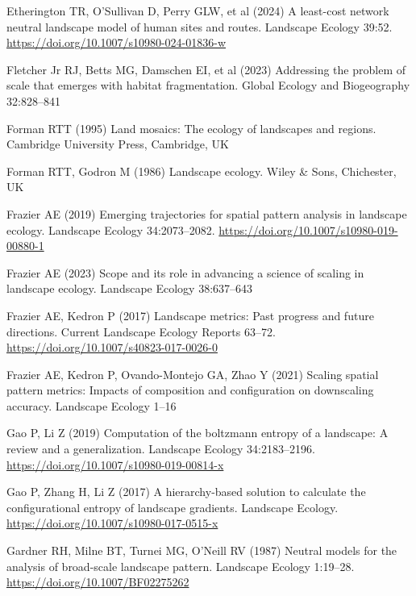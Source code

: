 \documentclass[
  10pt,
  a4paperpaper,
]{article}
\newlength{\cslhangindent}
\newenvironment{CSLReferences}[2] %
 {\begin{list}{}{%
  \setlength{\itemindent}{0pt}
  \setlength{\leftmargin}{0pt}
  \setlength{\parsep}{0pt}
  \ifodd #1
   \setlength{\leftmargin}{\cslhangindent}
   \setlength{\itemindent}{-1\cslhangindent}
  \fi
  \setlength{\itemsep}{#2\baselineskip}}}
 {\end{list}}
\begin{document}
\begin{CSLReferences}{1}{1}
Etherington TR, O'Sullivan D, Perry GLW, et al (2024) A least-cost
network neutral landscape model of human sites and routes. Landscape
Ecology 39:52. \url{https://doi.org/10.1007/s10980-024-01836-w}

Fletcher Jr RJ, Betts MG, Damschen EI, et al (2023) Addressing the
problem of scale that emerges with habitat fragmentation. Global Ecology
and Biogeography 32:828--841

Forman RTT (1995) Land mosaics: The ecology of landscapes and regions.
Cambridge University Press, Cambridge, UK

Forman RTT, Godron M (1986) Landscape ecology. Wiley \& Sons,
Chichester, UK

Frazier AE (2019) Emerging trajectories for spatial pattern analysis in
landscape ecology. Landscape Ecology 34:2073--2082.
\url{https://doi.org/10.1007/s10980-019-00880-1}

Frazier AE (2023) Scope and its role in advancing a science of scaling
in landscape ecology. Landscape Ecology 38:637--643

Frazier AE, Kedron P (2017) Landscape metrics: Past progress and future
directions. Current Landscape Ecology Reports 63--72.
\url{https://doi.org/10.1007/s40823-017-0026-0}

Frazier AE, Kedron P, Ovando-Montejo GA, Zhao Y (2021) Scaling spatial
pattern metrics: Impacts of composition and configuration on downscaling
accuracy. Landscape Ecology 1--16

Gao P, Li Z (2019) Computation of the boltzmann entropy of a landscape:
A review and a generalization. Landscape Ecology 34:2183--2196.
\url{https://doi.org/10.1007/s10980-019-00814-x}

Gao P, Zhang H, Li Z (2017) A hierarchy-based solution to calculate the
configurational entropy of landscape gradients. Landscape Ecology.
\url{https://doi.org/10.1007/s10980-017-0515-x}

Gardner RH, Milne BT, Turnei MG, O'Neill RV (1987) Neutral models for
the analysis of broad-scale landscape pattern. Landscape Ecology
1:19--28. \url{https://doi.org/10.1007/BF02275262}


\end{CSLReferences}
\end{document}
